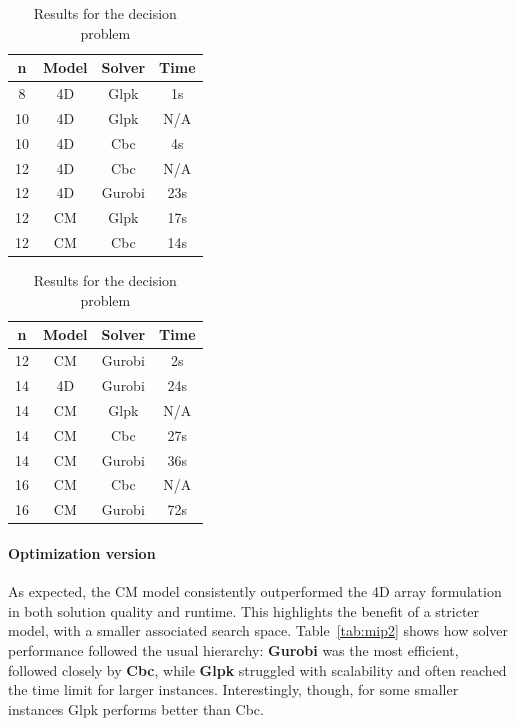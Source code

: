 \begin{table}[H]
    \centering
    \small
    \begin{tabular}{|c|c|c|c|}
    \hline
        \textbf{n} &  \textbf{Model} & \textbf{Solver} & \textbf{Time} \\
    \hline
         8 & 4D & Glpk & 1s \\
         10 & 4D & Glpk & N/A \\
         10 & 4D & Cbc & 4s \\
         12 & 4D & Cbc & N/A \\
         12 & 4D & Gurobi & 23s \\
         12 & CM & Glpk & 17s \\
         12 & CM & Cbc & 14s \\
    \hline
    \end{tabular}
    \begin{tabular}{|c|c|c|c|}
    \hline
        \textbf{n} &  \textbf{Model} & \textbf{Solver} & \textbf{Time} \\
    \hline
        12 & CM & Gurobi & 2s \\
         14 & 4D & Gurobi & 24s \\
         14 & CM & Glpk & N/A \\
         14 & CM & Cbc & 27s \\
         14 & CM & Gurobi & 36s \\
         16 & CM & Cbc & N/A \\
         16 & CM & Gurobi & 72s \\
    \hline
    \end{tabular}
    \caption{Results for the decision problem}
    \label{tab:mip1}
\end{table}

\paragraph{Optimization version}
As expected, the CM model consistently outperformed the 4D array formulation in both solution quality and runtime. This highlights the benefit of a stricter model, with a smaller associated search space.
Table~\ref{tab:mip2} shows how solver performance followed the usual hierarchy: \textbf{Gurobi} was the most efficient, followed closely by \textbf{Cbc}, while \textbf{Glpk} struggled with scalability and often reached the time limit for larger instances. 
Interestingly, though, for some smaller instances Glpk performs better than Cbc.


